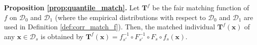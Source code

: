 \documentclass[10pt]{article} %
\newtheorem{lemma}[theorem]{Lemma}
\newtheorem{remark}[theorem]{Remark}
\begin{document}






    \textbf{Proposition \ref{prop:quantile_match}.}
    Let $\mathbf{T}^f$ be the {fair matching function} of $f$ on $\mathcal{D}_0$ and $\mathcal{D}_1$
    (where the empirical distributions with respect to $\mathcal{D}_0$ and $\mathcal{D}_1$ are used in Definition \ref{def:corr_match_f}).
    Then, the matched individual $ \mathbf{T}^{f} (\mathbf{x}) $ of any $\mathbf{x} \in {\mathcal{D}}_{s}$ is obtained by
    $ \mathbf{T}^{f}(\mathbf{x}) = f_{s'}^{-1} \circ F_{s'}^{-1} \circ F_{s} \circ f_{s}(\mathbf{x}). $
\end{document}
